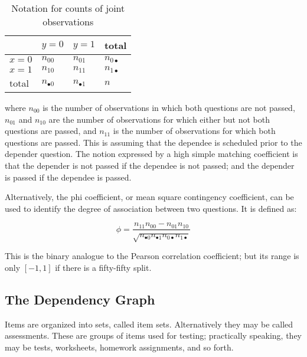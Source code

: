 \begin{table}
 \caption{Notation for counts of joint observations}
 \vspace{12pt}
 \begin{tabularx}{\textwidth}{|X|X|X|X|}
 \hline
        & \y $y=0$         & \y $y=1$         & \y total     \\ \hline
  \y $x=0$ & $n_{00}$      & $n_{01}$      & $n_{0 \bullet }$  \\ \hline
  \y $x=1$ & $n_{10}$      & $n_{11}$      & $n_{1 \bullet }$  \\ \hline
  \y total & $n_{\bullet 0}$ & $n_{\bullet 1}$ & $n$                \\ \hline
 \end{tabularx}
\vspace{24pt}
\end{table}

\begin{equations}
\end{equations}

where $n_{00}$ is the number of observations in which both questions are not
passed, $n_{01}$ and $n_{10}$ are the number of observations for which either
but not both questions are passed, and $n_{11}$ is the number of observations
for which both questions are passed.  This is assuming that the dependee is
scheduled prior to the depender question.  The notion expressed by a high
simple matching coefficient is that the depender is not passed if the dependee
is not passed; and the depender is passed if the dependee is passed.  

Alternatively, the phi coefficient, or mean square contingency coefficient,
can be used to identify the degree of association between two questions.
It is defined as:

\begin{equation}
 \phi = \frac{n_{11}n_{00} - n_{01}n_{10}}
 { 
   \sqrt{ n_{\bullet 0} n_{\bullet 1} n_{0 \bullet} n_{1 \bullet} } 
 }
\end{equation}

This is the binary analogue to the Pearson correlation coefficient; but its
range is only $[-1, 1]$ if there is a fifty-fifty split.  


\subsection{The Dependency Graph}

Items are organized into sets, called item sets.  Alternatively they may be
called assessments.  These are groups of items used for testing; practically
speaking, they may be tests, worksheets, homework assignments, and so forth. 

